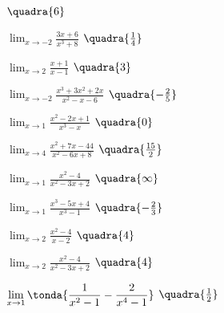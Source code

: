 \begin{esercizio}
\begin{multicols}{2}
\begin{enumeratea}
          \)
  \hfill \(\quadra{6}\)
  \item \(\displaystyle \lim_{x \rightarrow -2} 
          \frac{3x+6}{x^3+8}\)
  \hfill \(\quadra{\frac{1}{4}}\)
  \item \(\displaystyle \lim_{x \rightarrow 2} 
          \frac{x+1}{x-1}\)
  \hfill \(\quadra{3}\)
  \item \(\displaystyle \lim_{x \rightarrow -2} 
          \frac{x^3+3x^2+2x}{x^2-x-6}\)
  \hfill \(\quadra{-\frac{2}{5}}\)
  \item \(\displaystyle \lim_{x \rightarrow 1} 
          \frac{x^2-2x+1}{x^3-x}\)
  \hfill \(\quadra{0}\)
  \item \(\displaystyle \lim_{x \rightarrow 4} 
          \frac{x^2+7x-44}{x^2-6x+8}\)
  \hfill \(\quadra{\frac{15}{2}}\)
  \item \(\displaystyle \lim_{x \rightarrow 1} 
          \frac{x^2-4}{x^2-3x+2}\)
  \hfill \(\quadra{\infty}\)
  \item \(\displaystyle \lim_{x \rightarrow 1} 
          \frac{x^3-5x+4}{x^3-1}\)
  \hfill \(\quadra{-\frac{2}{3}}\)
  \item \(\displaystyle \lim_{x \rightarrow 2} 
          \frac{x^2-4}{x-2}\)
  \hfill \(\quadra{4}\)
  \item \(\displaystyle \lim_{x \rightarrow 2} 
          \frac{x^2-4}{x^2-3x+2}\)
  \hfill \(\quadra{4}\)
  \item \(\displaystyle \lim_{x \rightarrow 1} 
          \tonda{\frac{1}{x^2-1}-\frac{2}{x^4-1}}\)
  \hfill \(\quadra{\frac{1}{2}}\)
 \end{enumeratea}
 \end{multicols}
\end{esercizio}

